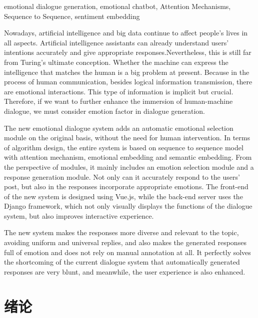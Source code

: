 \documentclass[supercite]{HustGraduPaper}
\theoremstyle{definition}
\begin{document}
\begin{enabstract}{emotional dialogue generation, emotional chatbot, Attention Mechanisms, Sequence to Sequence, sentiment embedding}

Nowadays, artificial intelligence and big data continue to affect people's lives in all aspects. Artificial intelligence 
assistants can already understand users' intentions accurately and give appropriate responses.Nevertheless, this is still 
far from Turing's ultimate conception. Whether the machine can express the intelligence that matches the human is a big problem 
at present. Because in the process of human communication, besides logical information transmission, there are emotional 
interactions. This type of information is implicit but crucial. Therefore, if we want to further enhance the immersion 
of human-machine dialogue, we must consider emotion factor in dialogue generation.
  
The new emotional dialogue system adds an automatic emotional selection module on the original basis, without the need for human intervention. 
In terms of algorithm design, the entire system is based on sequence to sequence model with attention mechanism, emotional embedding 
and semantic embedding. From the perspective of modules, it mainly includes an emotion selection module and a response generation module. 
Not only can it accurately respond to the users' post, but also in the responses incorporate appropriate emotions. The front-end of the new system
is designed using Vue.js, while the back-end server uses the Django framework, which not only visually displays 
the functions of the dialogue system, but also improves interactive experience.

The new system makes the responses more diverse and relevant to the topic, avoiding uniform and universal replies, and also makes the 
generated responses full of emotion and does not rely on manual annotation at all. It perfectly solves the shortcoming of the current 
dialogue system that automatically generated responses are very blunt, and meanwhile, the user experience is also enhanced.



\end{enabstract}

\tableofcontents[level=2]
\clearpage


\section{绪论}
\end{document}

